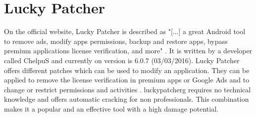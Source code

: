 \section{Lucky Patcher} \label{section:luckypatcher-explain}
On the official website, Lucky Patcher is described as "[...] a great Android tool to remove ads, modify apps permissions, backup and restore apps, bypass premium applications license verification, and more" \cite{luckyPatcherOfficial}.
It is written by a developer called ChelpuS and currently on version is 6.0.7 (03/03/2016).
\newline
Lucky Patcher offers different patches which can be used to modify an application.
They can be applied to remove the license verification in premium apps or Google Ads and to change or restrict permissions and activities \cite{luckyPatcherOfficial}.
\newline
\gls{luckypatcherg} requires no technical knowledge and offers automatic cracking for non professionals.
This combination makes it a popular and an effective tool with a high damage potential. \cite{munteanLicense}
\newline
